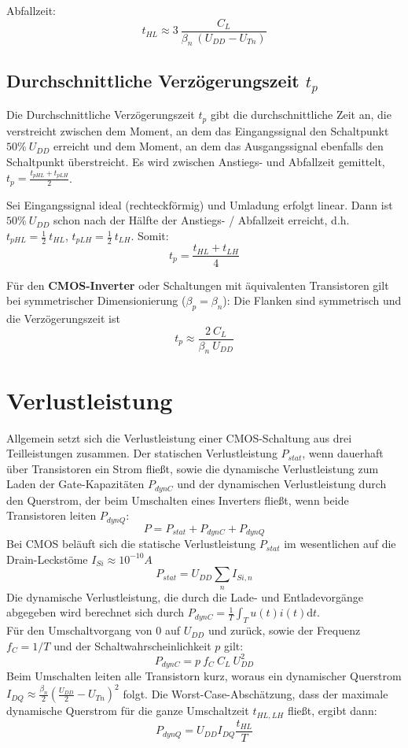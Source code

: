 \documentclass[a4paper,11pt]{article}
\begin{document}
Abfallzeit:
\[
	\boxed{ \quad t_{HL} \approx 3 ~ \frac{C_L}{\beta_n ~ (U_{DD} - U_{Tn})} \quad }
\]

\subsection*{Durchschnittliche Verzögerungszeit $t_p$}
Die Durchschnittliche Verzögerungszeit $t_p$ gibt die durchschnittliche Zeit an, die verstreicht zwischen dem Moment, an dem das Eingangssignal den Schaltpunkt $50 \% ~ U_{DD}$ erreicht und dem Moment, an dem das Ausgangssignal ebenfalls den Schaltpunkt überstreicht. Es wird zwischen Anstiegs- und Abfallzeit gemittelt, $t_p = \frac{t_{pHL} + t_{pLH}}{2}$.

Sei Eingangssignal ideal (rechteckförmig) und Umladung erfolgt linear. Dann ist $50 \% ~ U_{DD}$ schon nach der Hälfte der Anstiegs- / Abfallzeit erreicht, d.h. $t_{pHL} = \frac{1}{2} ~ t_{HL}$, $t_{pLH} = \frac{1}{2} ~ t_{LH}$. Somit:
\[
	t_p = \frac{t_{HL} + t_{LH}}{4}
\]

Für den \textbf{CMOS-Inverter} oder Schaltungen mit äquivalenten Transistoren gilt bei symmetrischer Dimensionierung ($\beta_p = \beta_n$): Die Flanken sind symmetrisch und die Verzögerungszeit ist
\[
	\boxed{ \quad t_p \approx \frac{2 ~ C_L}{\beta_n ~ U_{DD}} \quad }
\]

\newpage
\section*{Verlustleistung}
Allgemein setzt sich die Verlustleistung einer CMOS-Schaltung aus drei Teilleistungen zusammen. Der statischen Verlustleistung $P_{stat}$, wenn dauerhaft über Transistoren ein Strom fließt, sowie die dynamische Verlustleistung zum Laden der Gate-Kapazitäten $P_{dynC}$ und der dynamischen Verlustleistung durch den Querstrom, der beim Umschalten eines Inverters fließt, wenn beide Transistoren leiten $P_{dynQ}$:
\[ \boxed{P=P_{stat}+P_{dynC}+P_{dynQ}} \]
Bei CMOS beläuft sich die statische Verlustleistung $P_{stat}$ im wesentlichen auf die Drain-Leckstöme $I_{Si}\approx10^{-10}A$
\[ \boxed{P_{stat}=U_{DD}\sum_n I_{Si,n}} \]
Die dynamische Verlustleistung, die durch die Lade- und Entladevorgänge abgegeben wird berechnet sich durch $P_{dynC}=\frac{1}{T}\displaystyle\int_Tu(t)i(t)\mathrm{d}t$.\\
Für den Umschaltvorgang von $0$ auf $U_{DD}$ und zurück, sowie der Frequenz $f_C=1/T$ und der Schaltwahrscheinlichkeit $p$ gilt:
\[ \boxed{P_{dynC}=p\ f_C\ C_L \ U_{DD}^2} \]
Beim Umschalten leiten alle Transistorn kurz, woraus ein dynamischer Querstrom $I_{DQ}\approx\frac{\beta_n}{2}\left(\frac{U_{DD}}{2}-U_{Tn}\right)^2$ folgt. Die Worst-Case-Abschätzung, dass der maximale dynamische Querstrom für die ganze Umschaltzeit $t_{HL,LH}$ fließt, ergibt dann:
\[ \boxed{P_{dynQ}=U_{DD}I_{DQ}\frac{t_{HL}}{T}} \] 
\end{document}
